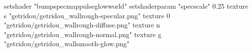 setshader "bumpspecmappulseglowworld"
setshaderparam "specscale" 0.25
texture s "getridou/getridou_wallrough-specular.png"
texture 0 "getridou/getridou_wallrough-diffuse.png"
texture n "getridou/getridou_wallrough-normal.png"
texture g "getridou/getridou_wallsmooth-glow.png"